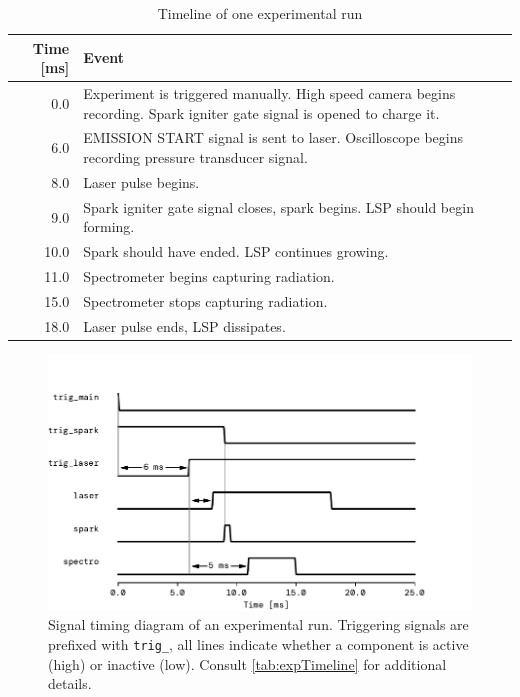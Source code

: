                 \begin{table}[h]
                    \centering
                    \caption{Timeline of one experimental run}
                    \label{tab:expTimeline}
                    \begin{tabularx}{\textwidth}{rX}
                        \toprule
                        Time [ms]   & Event \\
                        \midrule
                        0.0         & Experiment is triggered manually. High speed camera begins recording. Spark igniter gate signal is opened to charge it. \\
                        6.0         & EMISSION START signal is sent to laser. Oscilloscope begins recording pressure transducer signal. \\
                        8.0         & Laser pulse begins.    \\
                        9.0         & Spark igniter gate signal closes, spark begins. LSP should begin forming. \\
                        10.0        & Spark should have ended. LSP continues growing.   \\
                        11.0        & Spectrometer begins capturing radiation.  \\
                        15.0        & Spectrometer stops capturing radiation.   \\
                        18.0        & Laser pulse ends, LSP dissipates. \\
                        \bottomrule
                    \end{tabularx}
                \end{table}
                
                \begin{figure}[h]
                    \centering
                    \includegraphics[]{assets/3 design/timings}
                    \caption[Signal timing diagram of an experimental run]{Signal timing diagram of an experimental run. Triggering signals are prefixed with \texttt{trig\_}, all lines indicate whether a component is active (high) or inactive (low). Consult \autoref{tab:expTimeline} for additional details.}
                    \label{fig:timings}
                \end{figure}
                
